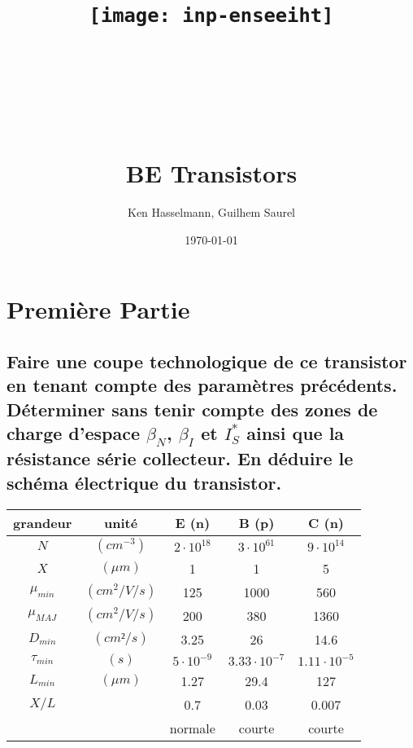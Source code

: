 \documentclass[10pt]{article}
\title{\texttt{[image: inp-enseeiht]} \\ ~ \\ ~ \\ ~ \\ ~ \\ BE Transistors }
\author{Ken Hasselmann, Guilhem Saurel}
\date{\today}
\begin{document}
 \section{Première Partie}
  \subsection{Faire une coupe technologique de ce transistor en tenant compte des paramètres précédents. Déterminer sans tenir compte des zones de charge d’espace $\beta_N$, $\beta_I$ et $I_S^\ast$ ainsi que la résistance série collecteur. En déduire le schéma électrique du transistor.}

    \begin{tabular}{|c|c|c|c|c|}
     \hline
      grandeur     & unité        & E (n)            & B (p)               & C (n)\\
     \hline                                                                
      $N$          &$(cm^{-3})$   & $2\cdot 10^{18}$ & $3\cdot 10^{61}$    & $9\cdot 10^{14}$ \\
     \hline                                                                
      $X$          & $(\mu m)$    & 1                & 1                   & 5 \\
     \hline                                                                
      $\mu_{min}$  & $(cm^2/V/s)$ & 125              & 1000                & 560 \\
     \hline                                                                
      $\mu_{MAJ}$  & $(cm^2/V/s)$ & 200              & 380                 & 1360 \\
     \hline                                                                
      $D_{min}$    & $(cm²/s)$    & 3.25             & 26                  & 14.6 \\
     \hline        
      $\tau_{min}$ & $(s)$        & $5\cdot 10^{-9}$ & $3.33\cdot 10^{-7}$ & $1.11\cdot 10^{-5}$\\
     \hline        
      $L_{min}$    & $(\mu m)$    & 1.27             & 29.4                & 127 \\
     \hline                                                                
      $X/L$        &              & 0.7              & 0.03                & 0.007 \\
     \hline                                                                
                   &              & normale          & courte              & courte\\
     \hline
    \end{tabular}
   
\end{document}

